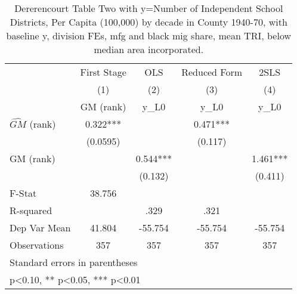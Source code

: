 \begin{table}[htbp]\centering
\def\sym#1{\ifmmode^{#1}\else\(^{#1}\)\fi}
\caption{Dererencourt Table Two with y=Number of Independent School Districts, Per Capita (100,000) by decade in County 1940-70, with baseline y, division FEs, mfg and black mig share, mean TRI, below median area incorporated.}
\begin{tabular}{l*{4}{c}}
\toprule
                    & First Stage   &         OLS   &Reduced Form   &        2SLS   \\
                    &\multicolumn{1}{c}{(1)}&\multicolumn{1}{c}{(2)}&\multicolumn{1}{c}{(3)}&\multicolumn{1}{c}{(4)}\\
                    &\multicolumn{1}{c}{GM  (rank)}&\multicolumn{1}{c}{y\_L0}&\multicolumn{1}{c}{y\_L0}&\multicolumn{1}{c}{y\_L0}\\
\midrule
$\hat{GM}$ (rank)   &       0.322***&               &       0.471***&               \\
                    &    (0.0595)   &               &     (0.117)   &               \\
\addlinespace
GM  (rank)          &               &       0.544***&               &       1.461***\\
                    &               &     (0.132)   &               &     (0.411)   \\
\midrule
F-Stat              &      38.756   &               &               &               \\
R-squared           &               &        .329   &        .321   &               \\
Dep Var Mean        &      41.804   &     -55.754   &     -55.754   &     -55.754   \\
Observations        &         357   &         357   &         357   &         357   \\
\bottomrule
\multicolumn{5}{l}{\footnotesize Standard errors in parentheses}\\
\multicolumn{5}{l}{\footnotesize * p<0.10, ** p<0.05, *** p<0.01}\\
\end{tabular}
\end{table}
